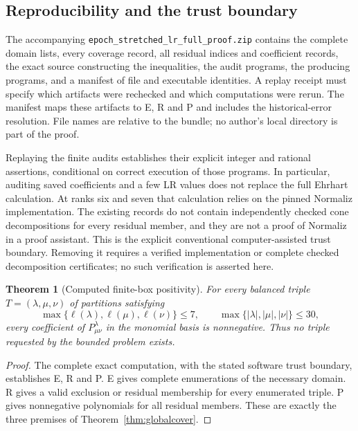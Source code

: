 \documentclass[11pt]{article}
\newtheorem{theorem}{Theorem}
\begin{document}
\subsection{Reproducibility and the trust boundary}
The accompanying \texttt{epoch\_stretched\_lr\_full\_proof.zip}
contains the complete domain lists, every
coverage record, all residual indices and coefficient records, the exact
source constructing the inequalities, the audit programs, the producing
programs, and a manifest of file and executable identities. A replay
receipt must specify which artifacts were rechecked and which computations
were rerun. The manifest maps these artifacts to E, R and P and includes
the historical-error resolution. File names are relative to the bundle;
no author's local directory is part of the proof.

Replaying the finite audits establishes their explicit integer and
rational assertions, conditional on correct execution of those programs.
In particular, auditing saved coefficients and a few LR values does not
replace the full Ehrhart calculation. At ranks six and seven that
calculation relies on the pinned Normaliz implementation. The existing
records do not contain independently checked cone decompositions for
every residual member, and they are not a proof of Normaliz in a proof
assistant. This is the explicit conventional computer-assisted trust
boundary. Removing it requires a verified implementation or complete
checked decomposition certificates; no such verification is asserted here.

\begin{theorem}[Computed finite-box positivity]\label{thm:box}
For every balanced triple
$T=(\lambda,\mu,\nu)$ of partitions satisfying
\[
 \max\{\ell(\lambda),\ell(\mu),\ell(\nu)\}\le7,
 \qquad\max\{|\lambda|,|\mu|,|\nu|\}\le30,
\]
every coefficient of $P^\lambda_{\mu\nu}$ in the monomial basis is
nonnegative. Thus no triple requested by the bounded problem exists.
\end{theorem}
\begin{proof}
The complete exact computation, with the stated software trust boundary,
establishes E, R and P. E gives complete enumerations of the necessary
domain. R gives a valid
exclusion or residual membership for every enumerated triple. P gives
nonnegative polynomials for all residual members. These are exactly the
three premises of Theorem~\ref{thm:globalcover}.
\end{proof}
\end{document}
